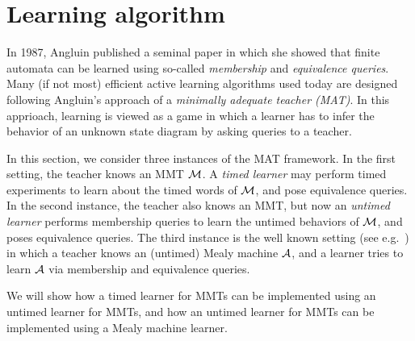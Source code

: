 
\section{Learning algorithm}  
In 1987, Angluin \cite{Ang87} published a seminal paper in which she showed that finite automata can be learned using so-called \emph{membership} and \emph{equivalence queries}.
Many (if not most) efficient active learning algorithms used
today are designed following Angluin's approach of a \emph{minimally adequate teacher (MAT)}.
In this apprioach, learning is viewed as a game in which a learner has to infer the behavior of
an unknown state diagram by asking queries to a teacher.

In this section, we consider three instances of the MAT framework.
In the first setting, the teacher knows an MMT ${\cal M}$. 
A \emph{timed learner} may perform timed experiments to learn about the
timed words of ${\cal M}$, and pose equivalence queries.
In the second instance, the teacher also knows an MMT, but now an \emph{untimed learner} performs membership queries
to learn the untimed behaviors of ${\cal M}$, and poses equivalence queries.
The third instance is the well known setting (see e.g.\ \cite{Nie03,RSBM09}) in which a teacher knows an (untimed) Mealy machine ${\cal A}$,
and a learner tries to learn ${\cal A}$ via membership and equivalence queries.

We will show how a timed learner for MMTs can be implemented using an untimed learner for MMTs,
and how an untimed learner for MMTs can be implemented using a Mealy machine learner.

